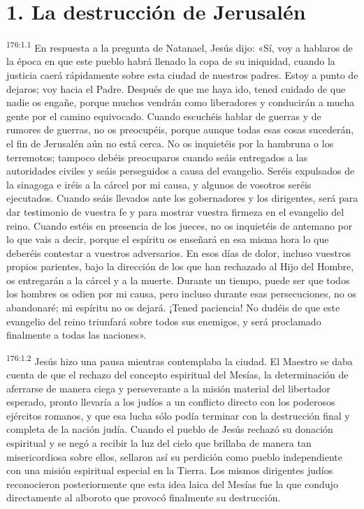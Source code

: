 \section*{1. La destrucción de Jerusalén}
\par 
\textsuperscript{176:1.1} En respuesta a la pregunta de Natanael, Jesús dijo: «Sí, voy a hablaros de la época en que este pueblo habrá llenado la copa de su iniquidad, cuando la justicia caerá rápidamente sobre esta ciudad de nuestros padres. Estoy a punto de dejaros; voy hacia el Padre. Después de que me haya ido, tened cuidado de que nadie os engañe, porque muchos vendrán como liberadores y conducirán a mucha gente por el camino equivocado. Cuando escuchéis hablar de guerras y de rumores de guerras, no os preocupéis, porque aunque todas esas cosas sucederán, el fin de Jerusalén aún no está cerca. No os inquietéis por la hambruna o los terremotos; tampoco debéis preocuparos cuando seáis entregados a las autoridades civiles y seáis perseguidos a causa del evangelio. Seréis expulsados de la sinagoga e iréis a la cárcel por mi causa, y algunos de vosotros seréis ejecutados. Cuando seáis llevados ante los gobernadores y los dirigentes, será para dar testimonio de vuestra fe y para mostrar vuestra firmeza en el evangelio del reino. Cuando estéis en presencia de los jueces, no os inquietéis de antemano por lo que vais a decir, porque el espíritu os enseñará en esa misma hora lo que deberéis contestar a vuestros adversarios. En esos días de dolor, incluso vuestros propios parientes, bajo la dirección de los que han rechazado al Hijo del Hombre, os entregarán a la cárcel y a la muerte. Durante un tiempo, puede ser que todos los hombres os odien por mi causa, pero incluso durante esas persecuciones, no os abandonaré; mi espíritu no os dejará. ¡Tened paciencia! No dudéis de que este evangelio del reino triunfará sobre todos sus enemigos, y será proclamado finalmente a todas las naciones».

\par 
\textsuperscript{176:1.2} Jesús hizo una pausa mientras contemplaba la ciudad. El Maestro se daba cuenta de que el rechazo del concepto espiritual del Mesías, la determinación de aferrarse de manera ciega y perseverante a la misión material del libertador esperado, pronto llevaría a los judíos a un conflicto directo con los poderosos ejércitos romanos, y que esa lucha sólo podía terminar con la destrucción final y completa de la nación judía. Cuando el pueblo de Jesús rechazó su donación espiritual y se negó a recibir la luz del cielo que brillaba de manera tan misericordiosa sobre ellos, sellaron así su perdición como pueblo independiente con una misión espiritual especial en la Tierra. Los mismos dirigentes judíos reconocieron posteriormente que esta idea laica del Mesías fue la que condujo directamente al alboroto que provocó finalmente su destrucción.

